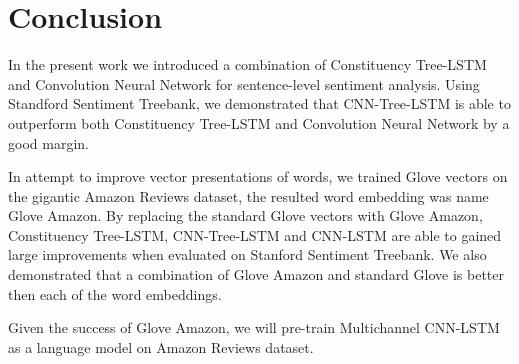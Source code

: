 \section{Conclusion}
In the present work we introduced a combination of Constituency Tree-LSTM and Convolution Neural Network for sentence-level sentiment analysis. 
Using Standford Sentiment Treebank, we demonstrated that CNN-Tree-LSTM is able to outperform both Constituency Tree-LSTM and Convolution Neural Network by a good margin.

In attempt to improve vector presentations of words, we trained Glove vectors on the gigantic Amazon Reviews dataset, the resulted word embedding was name Glove Amazon.
By replacing the standard Glove vectors with Glove Amazon, Constituency Tree-LSTM, CNN-Tree-LSTM and CNN-LSTM are able to gained large improvements when evaluated on Stanford Sentiment Treebank.
We also demonstrated that a combination of Glove Amazon and standard Glove is better then each of the word embeddings.

Given the success of Glove Amazon, we will pre-train Multichannel CNN-LSTM as a language model on Amazon Reviews dataset.

